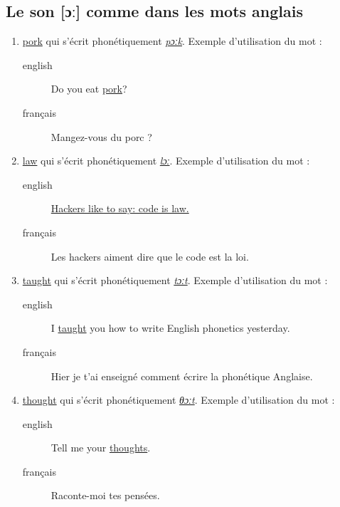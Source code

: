 \documentclass[12pt,a4paper]{book}
\begin{document}
\subsection{Le son [ɔː] comme dans les mots anglais}
\label{sec:orgab83d97}
\begin{enumerate}
\item \href{http://www.wordreference.com/enfr/pork}{pork} qui s'écrit phonétiquement \href{https://en.oxforddictionaries.com/definition/pork}{\emph{pɔːk}}. Exemple d'utilisation du mot :
\begin{description}
\item[{english}] \textenglish{Do you eat \href{https://youtu.be/WqTJbyfewzw}{pork}?}
\item[{français}] Mangez-vous du porc ?
\end{description}
\item \href{http://www.wordreference.com/enfr/law}{law} qui s'écrit phonétiquement \href{https://en.oxforddictionaries.com/definition/law}{\emph{lɔː}}. Exemple d'utilisation du mot : 
\begin{description}
\item[{english}] \textenglish{\href{https://youtu.be/us5CUAsH0U0}{Hackers like to say: code is law.}}
\item[{français}] Les hackers aiment dire que le code est la loi.
\end{description}
\item \href{http://www.wordreference.com/enfr/taught}{taught} qui s'écrit phonétiquement \href{https://en.oxforddictionaries.com/definition/taught}{\emph{tɔːt}}. Exemple d'utilisation du mot :
\begin{description}
\item[{english}] \textenglish{I \href{https://youtu.be/U2BG2\_K2fGk}{taught} you how to write English phonetics yesterday.}
\item[{français}] Hier je t'ai enseigné comment écrire la phonétique
Anglaise.
\end{description}
\item \href{http://www.wordreference.com/enfr/thought}{thought} qui s'écrit phonétiquement \href{https://en.oxforddictionaries.com/definition/thought}{\emph{θɔːt}}. Exemple d'utilisation du mot : 
\begin{description}
\item[{english}] \textenglish{Tell me your \href{https://youtu.be/8kR-GDbYHhc}{thoughts}.}
\item[{français}] Raconte-moi tes pensées.
\end{description}
\end{enumerate}
\end{document}
